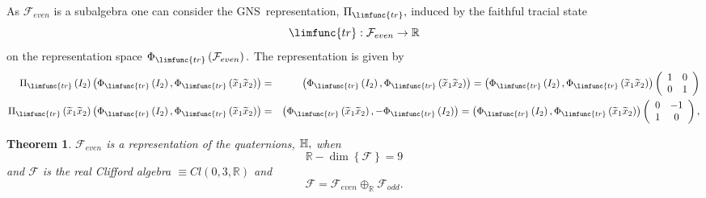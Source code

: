 \documentclass[aps,preprint]{revtex4}
\newtheorem{theorem}{Theorem}
\begin{document}
As $\mathcal{F}_{even}$ is a subalgebra one can consider the GNS\
representation, $\Pi _{\limfunc{tr}},$ induced by the faithful tracial state 
\begin{equation}
\limfunc{tr}:\mathcal{F}_{even}\rightarrow \mathbb{R}
\end{equation}%
on the representation space $\Phi _{\limfunc{tr}}\left( \mathcal{F}%
_{even}\right) .$ The representation is given by 
\begin{eqnarray}
\Pi _{\limfunc{tr}}\left( I_{2}\right) \left( \Phi _{\limfunc{tr}}\left(
I_{2}\right) ,\Phi _{\limfunc{tr}}\left( \widetilde{x}_{1}\widetilde{x}%
_{2}\right) \right) &=&\left( \Phi _{\limfunc{tr}}\left( I_{2}\right) ,\Phi
_{\limfunc{tr}}\left( \widetilde{x}_{1}\widetilde{x}_{2}\right) \right)
=\left( \Phi _{\limfunc{tr}}\left( I_{2}\right) ,\Phi _{\limfunc{tr}}\left( 
\widetilde{x}_{1}\widetilde{x}_{2}\right) \right) \left( 
\begin{array}{cc}
1 & 0 \\ 
0 & 1%
\end{array}%
\right) \\
\Pi _{\limfunc{tr}}\left( \widetilde{x}_{1}\widetilde{x}_{2}\right) \left(
\Phi _{\limfunc{tr}}\left( I_{2}\right) ,\Phi _{\limfunc{tr}}\left( 
\widetilde{x}_{1}\widetilde{x}_{2}\right) \right) &=&\left( \Phi _{\limfunc{%
tr}}\left( \widetilde{x}_{1}\widetilde{x}_{2}\right) ,-\Phi _{\limfunc{tr}%
}\left( I_{2}\right) \right) =\left( \Phi _{\limfunc{tr}}\left( I_{2}\right)
,\Phi _{\limfunc{tr}}\left( \widetilde{x}_{1}\widetilde{x}_{2}\right)
\right) \left( 
\begin{array}{cc}
0 & -1 \\ 
1 & 0%
\end{array}%
\right) ,
\end{eqnarray}

\begin{theorem}
$\mathcal{F}_{even}$ is a representation of the \emph{quaternions, }$\mathbb{%
H},$ when%
\begin{equation}
\mathbb{R}-\dim \left\{ \mathcal{F}\right\} =9
\end{equation}%
and $\mathcal{F}$ is the \emph{real} \emph{Clifford algebra} $\equiv
Cl\left( 0,3,\mathbb{R}\right) $ and 
\begin{equation}
\mathcal{F}=\mathcal{F}_{even}\oplus _{\mathbb{R}}\mathcal{F}_{odd}.
\end{equation}
\end{theorem}
\end{document}
